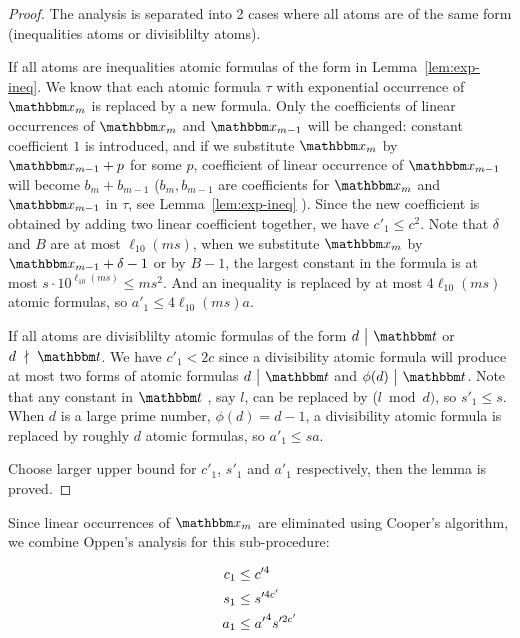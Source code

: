 \begin{proof}
   
The analysis is separated into 2 cases where all atoms are of the same form (inequalities atoms or divisiblilty atoms). 

If all atoms are inequalities atomic formulas of the form in Lemma~\ref{lem:exp-ineq}. We know that each atomic formula $\tau$ with exponential occurrence of $\ivarx_m$ is replaced by a new formula. Only the coefficients of linear occurrences of $\ivarx_m$ and $\ivarx_{m-1}$ will be changed: constant coefficient $1$ is introduced, and if we substitute $\ivarx_m$ by $\ivarx_{m-1}+p$ for some $p$, coefficient of linear occurrence of $\ivarx_{m-1}$ will become $b_m+b_{m-1}$ ($b_m,b_{m-1}$ are coefficients for $\ivarx_{m}$ and $\ivarx_{m-1}$ in $\tau$, see Lemma~\ref{lem:exp-ineq} ). Since the new coefficient is obtained by adding two linear coefficient together, we have $c'_1\le c^2$. Note that $\delta$ and $B$ are at most $\ell_{10}(ms)$, when we substitute $\ivarx_m$ by $\ivarx_{m-1}+\delta-1$ or by $B-1$, the largest constant in the formula is at most $s\cdot  10^{\ell_{10}(ms)}\le ms^2$. And an inequality is replaced by at most $4\ell_{10}(ms)$ atomic formulas, so $a'_1\le 4\ell_{10}(ms)a$.

If all atoms are divisiblilty atomic formulas of the form $d \ \big \vert  \ \iterm$ or $d \ \nmid \ \iterm$. We have $c'_1<2c$ since a divisibility atomic formula  will produce at most two forms of atomic formulas $d \ \big \vert  \ \iterm$ and $\phi(d) \ \big \vert  \ \iterm$. Note that any constant in $\iterm$ , say $l$, can be replaced by ($l \bmod d)$, so $s'_1\le s$. When $d$ is a large prime number, $\phi(d)=d-1$, a divisibility atomic formula is replaced by roughly $d$ atomic formulas, so $a'_1\le sa$. 

Choose larger upper bound for $c'_1$, $s'_1$ and $a'_1$ respectively, then the lemma is proved.

\end{proof}

Since linear occurrences of $\ivarx_m$ are eliminated using Cooper's algorithm, we combine Oppen's analysis for this sub-procedure:

\begin{lemma}\label{lem:cpx oppen}
    \begin{align}
        c_1&\le c'^4 \notag \\
        s_1&\le s'^{4c'} \notag\\
        a_1&\le {a'}^4 s'^{2c'}\notag 
    \end{align} 
\end{lemma}

